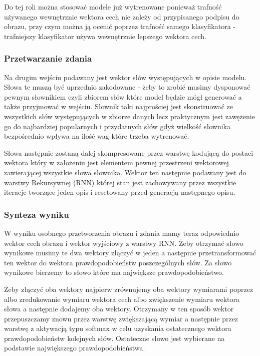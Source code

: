 Do tej roli można stosować modele już wytrenowane ponieważ trafność używanego wewnętrznie wektora cech nie zależy od przypisanego podpisu do obrazu, przy czym można ją ocenić poprzez trafność samego klasyfikatora - trafniejszy klasyfikator używa wewnętrznie lepszego wektora cech.
\subsubsection{Przetwarzanie zdania}
Na drugim wejściu podawany jest wektor słów występujących w opisie modelu. Słowa te muszą być uprzednio zakodowane - żeby to zrobić musimy dysponować pewnym słownikiem czyli zbiorem słów które model będzie mógł generować a także przyjmować w wejściu. Słownik taki najprościej jest skonstruować ze wszystkich słów występujących w zbiorze danych lecz praktycznym jest zawężenie go do najbardziej popularnych i przydatnych słów gdyż wielkość słownika bezpośrednio wpływa na ilość wag które trzeba wytrenować.

Słowa następnie zostaną dalej skompresowane przez warstwę kodującą do postaci wektora który w założeniu jest elementem pewnej przestrzeni wektorowej zawierającej wszystkie słowa słownika. Wektor ten następnie podawany jest do warstwy Rekursywnej (RNN) której stan jest zachowywany przez wszystkie iteracje tworzące jeden opis i resetowany przed generacją następnego opisu.
\subsubsection{Synteza wyniku}
W wyniku osobnego przetworzenia obrazu i zdania mamy teraz odpowiednio wektor cech obrazu i wektor wyjściowy z warstwy RNN. Żeby otrzymać słowo wynikowe musimy te dwa wektory złączyć w jeden a następnie przetransformować ten wektor do wektora prawdopodobieństw poszczególnych słów. Za słowo wynikowe bierzemy to słowo które ma największe prawdopodobieństwo.


Żeby złączyć oba wektory najpierw zrównujemy oba wektory wymiarami poprzez albo zredukowanie wymiaru wektora cech albo zwiększenie wymiaru wektora słowa a następnie dodajemy oba wektory. Otrzymany w ten sposób wektor przepuszczamy znowu przez warstwę zwiększającą wymiar a następnie przez warstwę z aktywacją typu softmax w celu uzyskania ostatecznego wektora prawdopodobieństw kolejnych słów. Ostateczne słowo jest wybierane na podstawie największego prawdopodobieństwa.

